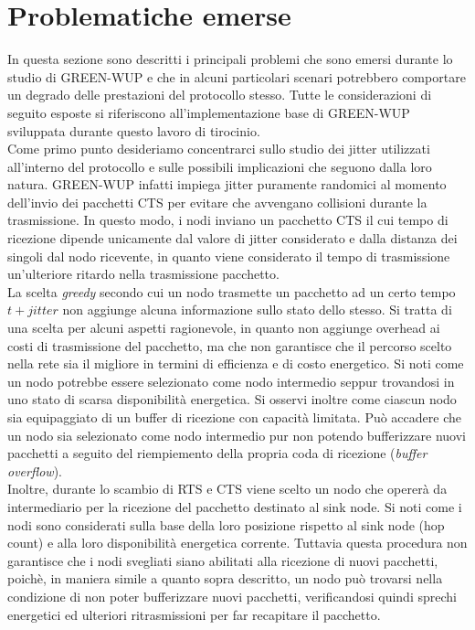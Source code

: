 \documentclass[binding=0.6cm,TFA]{sapthesis}
\begin{document}
\section{Problematiche emerse}

In questa sezione sono descritti i principali problemi che sono emersi durante lo studio di GREEN-WUP e che in alcuni particolari
scenari potrebbero comportare un degrado delle prestazioni del protocollo stesso. Tutte le considerazioni di seguito esposte si riferiscono
all'implementazione base di GREEN-WUP sviluppata durante questo lavoro di tirocinio.\\

Come primo punto desideriamo concentrarci sullo studio dei jitter utilizzati all'interno del protocollo e sulle possibili implicazioni che seguono dalla loro
natura. GREEN-WUP infatti impiega jitter puramente randomici al momento dell'invio dei pacchetti CTS per evitare che avvengano collisioni durante
la trasmissione. In questo modo, i nodi inviano un pacchetto CTS il cui tempo di ricezione dipende unicamente dal valore di jitter
considerato e dalla distanza dei singoli dal nodo ricevente, in quanto viene considerato il tempo di trasmissione un'ulteriore ritardo nella
trasmissione pacchetto.\\

La scelta \emph{greedy} secondo cui un nodo trasmette un pacchetto ad un certo tempo $t+jitter$ non aggiunge alcuna informazione sullo stato dello stesso.
Si tratta di una scelta per alcuni aspetti ragionevole, in quanto non aggiunge overhead ai costi di trasmissione del pacchetto, ma che non garantisce che
il percorso scelto nella rete sia il migliore in termini di efficienza e di costo energetico. Si noti come un nodo potrebbe essere selezionato come nodo
intermedio seppur trovandosi in uno stato di scarsa disponibilità energetica. Si osservi inoltre come ciascun nodo sia equipaggiato di un buffer di ricezione
con capacità limitata. Può accadere che un nodo sia selezionato come nodo intermedio pur non potendo bufferizzare nuovi pacchetti a
seguito del riempiemento della propria coda di ricezione (\emph{buffer overflow}).\\

Inoltre, durante lo scambio di RTS e CTS viene scelto un nodo che opererà da intermediario per la ricezione del pacchetto destinato al sink node. Si noti
come i nodi sono considerati sulla base della loro posizione rispetto al sink node (hop count) e alla loro disponibilità energetica corrente.
Tuttavia questa procedura non garantisce che i nodi svegliati siano abilitati alla ricezione di nuovi pacchetti, poichè, in maniera simile a quanto
sopra descritto, un nodo può trovarsi nella condizione di non poter bufferizzare nuovi pacchetti, verificandosi quindi sprechi energetici ed
ulteriori ritrasmissioni per far recapitare il pacchetto.\\
\end{document}

